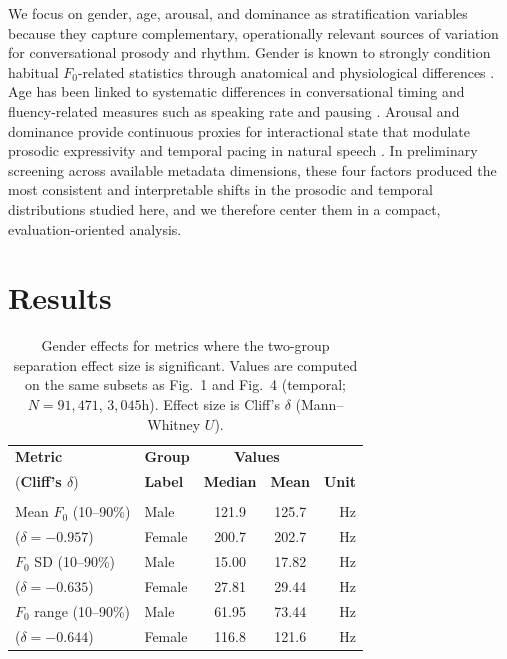 \documentclass[conference]{IEEEtran}
\begin{document}
We focus on gender, age, arousal, and dominance as stratification variables because they capture complementary, operationally relevant sources of variation for conversational prosody and rhythm. 
Gender is known to strongly condition habitual $F_0$-related statistics through anatomical and physiological differences \cite{traunmuller_acoustic_2000, titze_toward_1994}. 
Age has been linked to systematic differences in conversational timing and fluency-related measures such as speaking rate and pausing \cite{tauroza_speech_1990, goldman1958speech, goldman1961significance}. 
Arousal and dominance provide continuous proxies for interactional state that modulate prosodic expressivity and temporal pacing in natural speech \cite{banziger_role_2005, pell_emotional_2011, banse1996acoustic}. 
In preliminary screening across available metadata dimensions, these four factors produced the most consistent and interpretable shifts in the prosodic and temporal distributions studied here, and we therefore center them in a compact, evaluation-oriented analysis.

\section{Results}\label{sec:regimes}

\begin{table}[t]
\centering
\caption{Gender effects for metrics where the two-group separation effect size is significant. Values are computed on the same subsets as Fig.~1 and Fig.~4 (temporal; $N{=}91{,}471$, $3{,}045$h). Effect size is Cliff's $\delta$ (Mann--Whitney $U$).}
\label{tab:gender_effects}
\small
\setlength{\tabcolsep}{4pt}
\begin{tabular}{l l c c r}
\toprule
\textbf{Metric} & \textbf{Group} & \multicolumn{2}{c}{\textbf{Values}} \\
(\textbf{Cliff's $\delta$}) & \textbf{Label} & \textbf{Median} & \textbf{Mean} & \textbf{Unit}\\
\midrule
\rowcolor{gray!20}\multicolumn{5}{c}{\textbf{Prosody (Fig.~1)}} \\
Mean $F_0$ (10--90\%)     & Male   & 121.9 & 125.7 & Hz\\
($\delta=-0.957$)         & Female & 200.7 & 202.7 & Hz\\
$F_0$ SD (10--90\%)       & Male   & 15.00 & 17.82 & Hz\\
($\delta=-0.635$)         & Female & 27.81 & 29.44 & Hz\\
$F_0$ range (10--90\%)    & Male   & 61.95 & 73.44 & Hz\\
($\delta=-0.644$)         & Female & 116.8 & 121.6 & Hz\\
\bottomrule
\end{tabular}
\end{table}
\end{document}
